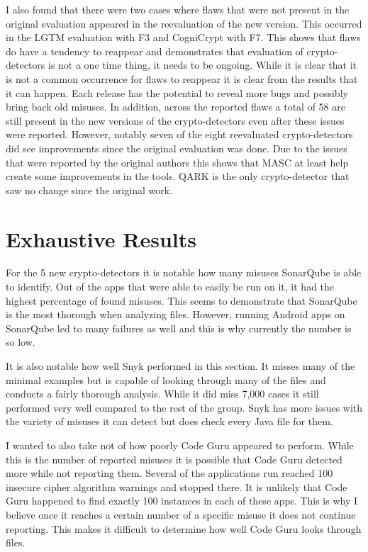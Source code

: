 I also found that there were two cases where flaws that were not present in the original evaluation appeared in the reevaluation of the new version. This occurred in the LGTM evaluation with F3 and CogniCrypt with F7.  This shows that flaws do have a tendency to reappear and demonstrates that evaluation of crypto-detectors is not a one time thing, it needs to be ongoing. While it is clear that it is not a common occurrence for flaws to reappear it is clear from the results that it can happen. Each release has the potential to reveal more bugs and possibly bring back old misuses. In addition, across the reported flaws a total of 58 are still present in the new versions of the crypto-detectors even after these issues were reported. However, notably seven of the eight reevaluated crypto-detectors did see improvements since the original evaluation was done. Due to the issues that were reported by the original authors this shows that MASC at least help create some improvements in the tools. QARK is the only crypto-detector that saw no change since the original work.

\section{Exhaustive Results}
\label{ch5:sec:exhaustive}



For the 5 new crypto-detectors it is notable how many misuses SonarQube is able to identify. Out of the apps that were able to easily be run on it, it had the highest percentage of found misuses. This seems to demonstrate that SonarQube is the most thorough when analyzing files. However, running Android apps on SonarQube led to many failures as well and this is why currently the number is so low.

It is also notable how well Snyk performed in this section. It misses many of the minimal examples but is capable of looking through many of the files and conducts a fairly thorough analysis. While it did miss 7,000 cases it still performed very well compared to the rest of the group. Snyk has more issues with the variety of misuses it can detect but does check every Java file for them.

I wanted to also take not of how poorly Code Guru appeared to perform. While this is the number of reported misuses it is possible that Code Guru detected more while not reporting them. Several of the applications run reached 100 insecure cipher algorithm warnings and stopped there. It is unlikely that Code Guru happened to find exactly 100 instances in each of these apps. This is why I believe once it reaches a certain number of a specific misuse it does not continue reporting. This makes it difficult to determine how well Code Guru looks through files.


